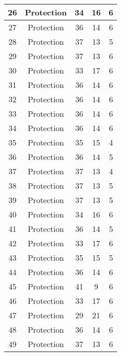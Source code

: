 \documentclass[results.tex]{subfiles}
\begin{document}
\begin{center}
\begin{tabular}{| c || c | c | c | c |}
    \hline
    26 & Protection & 34 & 16 & 6 \\ 
    \hline
    27 & Protection & 36 & 14 & 6 \\ 
    \hline
    28 & Protection & 37 & 13 & 5 \\ 
    \hline
    29 & Protection & 37 & 13 & 6 \\ 
    \hline
    30 & Protection & 33 & 17 & 6 \\ 
    \hline
    31 & Protection & 36 & 14 & 6 \\ 
    \hline
    32 & Protection & 36 & 14 & 6 \\ 
    \hline
    33 & Protection & 36 & 14 & 6 \\ 
    \hline
    34 & Protection & 36 & 14 & 6 \\ 
    \hline
    35 & Protection & 35 & 15 & 4 \\ 
    \hline
    36 & Protection & 36 & 14 & 5 \\ 
    \hline
    37 & Protection & 37 & 13 & 4 \\ 
    \hline
    38 & Protection & 37 & 13 & 5 \\ 
    \hline
    39 & Protection & 37 & 13 & 5 \\ 
    \hline
    40 & Protection & 34 & 16 & 6 \\ 
    \hline
    41 & Protection & 36 & 14 & 5 \\ 
    \hline
    42 & Protection & 33 & 17 & 6 \\ 
    \hline
    43 & Protection & 35 & 15 & 5 \\ 
    \hline
    44 & Protection & 36 & 14 & 6 \\ 
    \hline
    45 & Protection & 41 & 9 & 6 \\ 
    \hline
    46 & Protection & 33 & 17 & 6 \\ 
    \hline
    47 & Protection & 29 & 21 & 6 \\ 
    \hline
    48 & Protection & 36 & 14 & 6 \\ 
    \hline
    49 & Protection & 37 & 13 & 6 \\ 
    \hline   \end{tabular}
\end{center}
\end{document}
